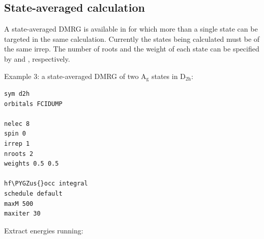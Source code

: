 \documentclass[letterpaper,10pt,english]{sphinxmanual}
\def\PYGZus{\char`\_}
\begin{document}
\subsection{State-averaged calculation}
\label{examples:state-averaged-calculation}
A state-averaged DMRG is available in  for which more than a single state can be targeted in the same calculation.
Currently the states being calculated must be of the same irrep.
The number of roots and the weight of each state can be specified by  and , respectively.

Example 3: a state-averaged DMRG of two A$_{\text{g}}$ states in D$_{\text{2h}}$:

\begin{Verbatim}[commandchars=\\\{\}]
sym d2h
orbitals FCIDUMP

nelec 8
spin 0
irrep 1
nroots 2
weights 0.5 0.5

hf\PYGZus{}occ integral
schedule default
maxM 500
maxiter 30
\end{Verbatim}

Extract energies running:
\end{document}
